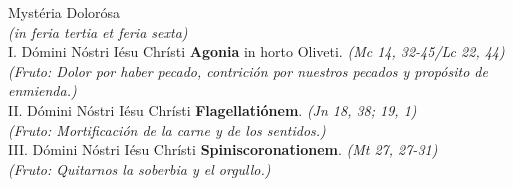\documentclass[letterpaper, landscape, 10pt, twocolumn]{article}
\begin{document}
  \Large {\color{red} Mystéria Dolorósa}\\
  \normalsize {\color{red} \textit{(in feria tertia et feria sexta)}}\\
  {\color{red} I.} Dómini Nóstri Iésu Chrísti \textbf{Agonia} in horto Oliveti. {\color{red} \textit{(Mc 14, 32-45/Lc 22, 44) (Fruto: Dolor por haber pecado, contrición por nuestros pecados y propósito de enmienda.)}}\\
  {\color{red} II.} Dómini Nóstri Iésu Chrísti \textbf{Flagellatiónem}. {\color{red} \textit{(Jn 18, 38; 19, 1)\\
  (Fruto: Mortificación de la carne y de los sentidos.)}}\\
  {\color{red} III.} Dómini Nóstri Iésu Chrísti \textbf{Spiniscoronationem}. {\color{red} \textit{(Mt 27, 27-31)\\
  (Fruto: Quitarnos la soberbia y el orgullo.)}}\\
\end{document}
